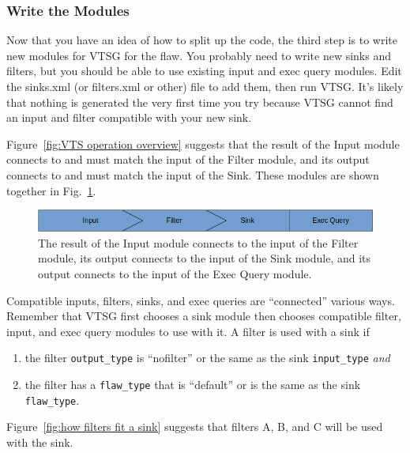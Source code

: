 \subsubsection{Write the Modules}

Now that you have an idea of how to split up the code, the third step is to
write new modules for VTSG for the flaw.  You probably need to write new sinks
and filters, but you should be able to use existing input and exec query
modules.  Edit the sinks.xml (or filters.xml or other) file to add them,
then run VTSG.  It's likely that nothing is generated the very first time you
try because VTSG cannot find an input and filter compatible with your new sink.

\label{sec:connecting inputs, filters, and sinks}
Figure~\ref{fig:VTS operation overview} suggests that the result of the Input module
connects to and must match the input of the Filter module, and its output connects to
and must match the input of the Sink.  These modules are shown together in
Fig.~\ref{fig:input, filter, and sink}.
\begin{figure}[htbp]
  \centerline{\includegraphics[width=\linewidth]{fig_input_filter_sink.png}}
  \caption{The result of the Input module connects to the input of the Filter module,
    its output connects to the input of the Sink module, and its output connects
    to the input of the Exec Query module.
  }
  \label{fig:input, filter, and sink}
\end{figure}
Compatible inputs, filters, sinks, and exec queries are ``connected'' various
ways.  Remember that
VTSG first chooses a sink module then chooses compatible filter, input, and exec
query modules to
use with it.
\label{sec:compatible modules}
A filter is used with a sink if
\begin{enumerate}[nosep]
\item the filter \verb|output_type| is ``nofilter'' or the same as the sink
  \verb|input_type| \emph{and}
\item the filter has a \verb|flaw_type| that is ``default'' or is the same as the
  sink \verb|flaw_type|.
\end{enumerate}
Figure~\ref{fig:how filters fit a sink} suggests that filters A, B, and C will
be used with the sink.
